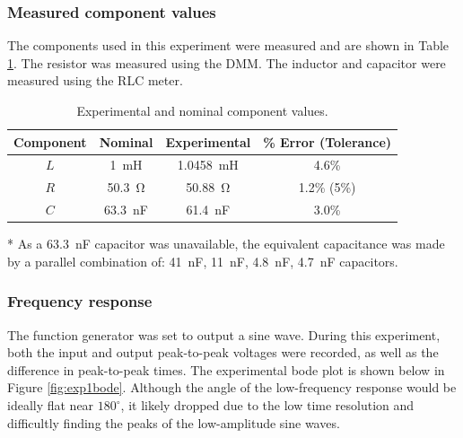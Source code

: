 \documentclass{report}
\begin{document}
\subsubsection{Measured component values}
The components used in this experiment were measured and are shown in Table \ref{table:exp1components}. The resistor was measured using the DMM. The inductor and capacitor were measured using the RLC meter.
\begin{table}[h]
	\centering
	\caption{Experimental and nominal component values.}
	\label{table:exp1components}
	\begin{threeparttable}
		\begin{tabular}{cccc}
			\toprule
			Component & Nominal & Experimental & \% Error (Tolerance) \\
			\midrule
			$L$  & \SI{1}{\milli\henry} & \SI{1.0458}{\milli\henry} & 4.6\%  \\
			$R$ & \SI{50.3}{\ohm} & \SI{50.88}{\ohm} & 1.2\% (5\%) \\
			$C$\tnote{*} & \SI{63.3}{\nano\farad} & \SI{61.4}{\nano\farad} & 3.0\% \\
			\bottomrule
		\end{tabular}
		\begin{tablenotes}
			\item[*] As a \SI{63.3}{\nano\farad} capacitor was unavailable, the equivalent capacitance was made by a parallel combination of: \SI{41}{\nano\farad}, \SI{11}{\nano\farad}, \SI{4.8}{\nano\farad}, \SI{4.7}{\nano\farad} capacitors.
		\end{tablenotes}
	\end{threeparttable}
\end{table}

\subsubsection{Frequency response}
The function generator was set to output a sine wave. During this experiment, both the input and output peak-to-peak voltages were recorded, as well as the difference in peak-to-peak times. The experimental bode plot is shown below in Figure \ref{fig:exp1bode}. Although the angle of the low-frequency response would be ideally flat near $180^\circ$, it likely dropped due to the low time resolution and difficultly finding the peaks of the low-amplitude sine waves.
\end{document}
